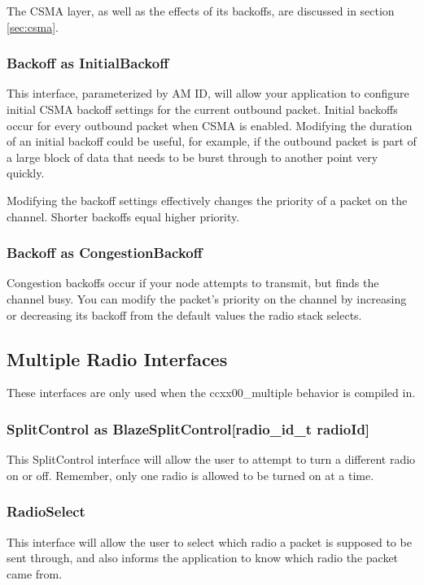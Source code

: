 \documentclass{article}
\begin{document}
The CSMA layer, as well as the effects of its backoffs, are discussed in section \ref{sec:csma}.

\subsubsection{Backoff as InitialBackoff}
This interface, parameterized by AM ID, will allow your application to configure initial
CSMA backoff settings for the current outbound packet. Initial backoffs occur for every outbound
packet when CSMA is enabled. Modifying the duration of an initial backoff could be useful, for example,
if the outbound packet is part of a large block of data that needs to be burst through
to another point very quickly.  

Modifying the backoff settings effectively changes the priority of a packet on the channel.
Shorter backoffs equal higher priority.

\subsubsection{Backoff as CongestionBackoff}
Congestion backoffs occur if your node attempts to transmit, but finds the channel busy.
You can modify the packet's priority on the channel by increasing or decreasing its backoff
from the default values the radio stack selects.

\subsection{Multiple Radio Interfaces}
\label{sec:multipleradiointerfaces}
These interfaces are only used when the ccxx00\_multiple behavior is compiled in.

\subsubsection{SplitControl as BlazeSplitControl[radio\_id\_t radioId]}
This SplitControl interface will allow the user to attempt to turn a different radio
on or off. Remember, only one radio is allowed to be turned on at a time.

\subsubsection{RadioSelect}
This interface will allow the user to select which radio a packet is supposed to be
sent through, and also informs the application to know which radio the packet came from.
\end{document}
